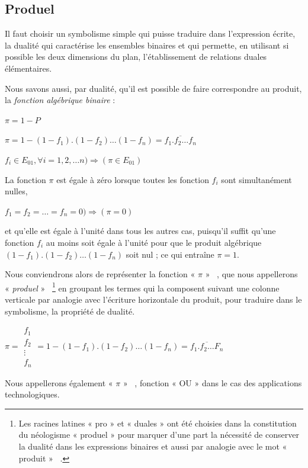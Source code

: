 \subsection{Produel}

Il faut choisir un symbolisme simple qui puisse traduire dans l'expression
écrite, la dualité qui caractérise les ensembles binaires et qui permette,
en utilisant si possible les deux dimensions du plan, l'établissement
de relations duales élémentaires.

Nous savons aussi, par dualité, qu'il est possible de faire correspondre
au produit, la \textit{fonction algébrique binaire} :

\centerline{$\pi=1-P$} \centerline{$\pi=1-(1-f_{1}).(1-f_{2})\ldots(1-f_{n})=\overline{f_{1}.f_{2}\ldots f_{n}}$}
\centerline{$f_{i}\in E_{01},\forall i=1,2,\ldots n)\Longrightarrow(\pi\in E_{01})$}

La fonction $\pi$ est égale à zéro lorsque toutes les fonction $f_{i}$
sont simultanément nulles,

\centerline{$f_{1}=f_{2}=\ldots=f_{n}=0)\Longrightarrow(\pi=0)$}

et qu'elle est égale à l'unité dans tous les autres cas, puisqu'il
suffit qu'une fonction $f_{i}$ au moins soit égale à l'unité pour
que le produit algébrique $(1-f_{1}).(1-f_{2})\ldots(1-f_{n})$ soit
nul ; ce qui entraîne $\pi=1$.

Nous conviendrons alors de représenter la fonction « $\pi$ » ~,
que nous appellerons « \textit{produel} » ~\footnote{Les racines latines « pro » et « duales » ont été choisies
dans la constitution du né\-o\-lo\-gisme « pro\-duel » pour
marquer d'une part la nécessité de conserver la dualité dans les expressions
binaires et aussi par analogie avec le mot « produit » ~.} en groupant les termes qui la composent suivant une colonne verticale
par analogie avec l'écriture horizontale du produit, pour traduire
dans le symbolisme, la propriété de dualité.

\begin{center}
$\pi=\begin{array}{|c|}
f_{1}\\
f_{2}\\
\vdots\\
f_{n}
\end{array}=1-(1-f_{1}).(1-f_{2})\ldots(1-f_{n})=\overline{f_{1}.f_{2}\ldots F_{n}}$
\end{center}

Nous appellerons également « $\pi$ » ~, fonction « OU »  dans
le cas des applications technologiques.

